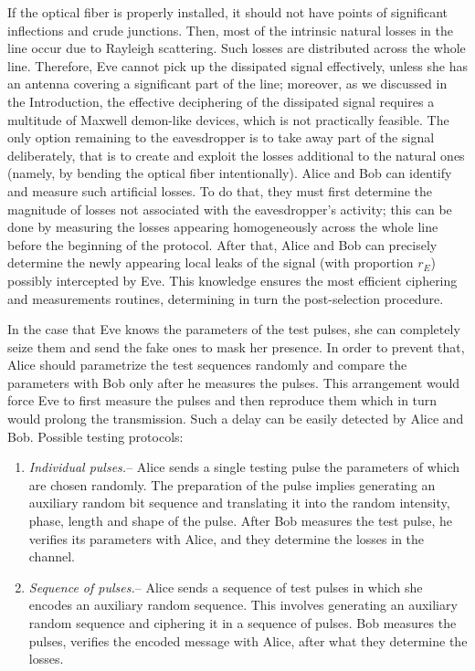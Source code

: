 \documentclass[a4paper]{article}
\begin{document}
If the optical fiber is properly installed, it should not have points of significant inflections and crude junctions.
Then, most of the intrinsic natural losses in the line occur due to Rayleigh scattering.
Such losses are distributed across the whole line.
Therefore, Eve cannot pick up the dissipated signal effectively, unless she has an antenna covering a significant part of the line;
moreover, as we discussed in the Introduction, the effective deciphering of the dissipated signal requires a multitude of Maxwell demon-like devices, which is not practically feasible.
The only option remaining to the eavesdropper is to take away part of the signal deliberately, that is to create and exploit the losses additional to the natural ones (namely, by bending the optical fiber intentionally).
Alice and Bob can identify and measure such artificial losses.
To do that, they must first determine the magnitude of losses not associated with the eavesdropper's activity; this can be done by measuring the losses appearing homogeneously across the whole line before the beginning of the protocol. 
After that, Alice and Bob can precisely determine the newly appearing local leaks of the signal (with proportion $r_E$) possibly intercepted by Eve.
This knowledge ensures the most efficient ciphering and measurements routines, determining in turn the post-selection procedure.

In the case that Eve knows the parameters of the test pulses, she can completely seize them and send the fake ones to mask her presence.
In order to prevent that, Alice should parametrize the test sequences randomly and compare the parameters with Bob only after he measures the pulses.
This arrangement would force Eve to first measure the pulses and then reproduce them which in turn would prolong the transmission.
Such a delay can be easily detected by Alice and Bob.
Possible testing protocols:
%
\begin{enumerate}
    \item \textit{Individual pulses.}-- Alice sends a single testing pulse the parameters of which are chosen randomly.
    The preparation of the pulse implies generating an auxiliary random bit sequence and translating it into the random intensity, phase, length and shape of the pulse.
    After Bob measures the test pulse, he verifies its parameters with Alice, and they determine the losses in the channel.
    \item \textit{Sequence of pulses.}-- Alice sends a sequence of test pulses in which she encodes an auxiliary random sequence.
    This involves generating an auxiliary random sequence and ciphering it in a sequence of pulses.
    Bob measures the pulses, verifies the encoded message with Alice, after what they determine the losses.
\end{enumerate}
\end{document}
